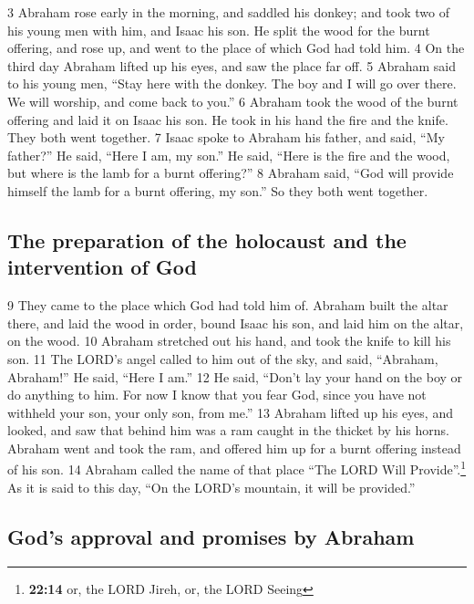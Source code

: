 {3} Abraham rose early in the morning, and saddled his donkey; and took
two of his young men with him, and Isaac his son. He split the wood for
the burnt offering, and rose up, and went to the place of which God had
told him. {4} On the third day Abraham lifted up his eyes, and saw the
place far off. {5} Abraham said to his young men, ``Stay here with the
donkey. The boy and I will go over there. We will worship, and come back
to you.'' {6} Abraham took the wood of the burnt offering and laid it on
Isaac his son. He took in his hand the fire and the knife. They both
went together. {7} Isaac spoke to Abraham his father, and said, ``My
father?'' He said, ``Here I am, my son.'' He said, ``Here is the fire
and the wood, but where is the lamb for a burnt offering?'' {8} Abraham
said, ``God will provide himself the lamb for a burnt offering, my
son.'' So they both went together.

\hypertarget{the-preparation-of-the-holocaust-and-the-intervention-of-god}{%
\subsection{The preparation of the holocaust and the intervention of
God}\label{the-preparation-of-the-holocaust-and-the-intervention-of-god}}

{9} They came to the place which God had told him of. Abraham built the
altar there, and laid the wood in order, bound Isaac his son, and laid
him on the altar, on the wood. {10} Abraham stretched out his hand, and
took the knife to kill his son. {11} The LORD's angel called to him out
of the sky, and said, ``Abraham, Abraham!'' He said, ``Here I am.'' {12}
He said, ``Don't lay your hand on the boy or do anything to him. For now
I know that you fear God, since you have not withheld your son, your
only son, from me.'' {13} Abraham lifted up his eyes, and looked, and
saw that behind him was a ram caught in the thicket by his horns.
Abraham went and took the ram, and offered him up for a burnt offering
instead of his son. {14} Abraham called the name of that place ``The
LORD Will Provide''.\footnote{\textbf{22:14} or, the LORD Jireh, or, the
  LORD Seeing} As it is said to this day, ``On the LORD's mountain, it
will be provided.''

\hypertarget{gods-approval-and-promises-by-abraham}{%
\subsection{God's approval and promises by
Abraham}\label{gods-approval-and-promises-by-abraham}}

